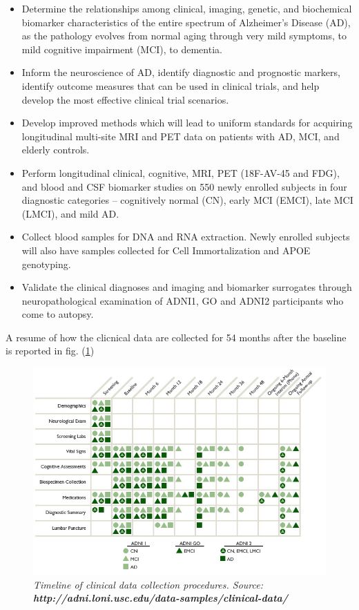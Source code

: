 \documentclass[12pt,openright,twoside,a4paper]{book}
\begin{document}
\begin{itemize}
\item Determine the relationships among clinical, imaging, genetic, and biochemical biomarker characteristics of the entire spectrum of Alzheimer’s Disease (AD), as the pathology evolves from normal aging through very mild symptoms, to mild cognitive impairment (MCI), to dementia.

\item Inform the neuroscience of AD, identify diagnostic and prognostic markers, identify outcome measures that can be used in clinical trials, and help develop the most effective clinical trial scenarios.

\item Develop improved methods which will lead to uniform standards for acquiring longitudinal multi-site MRI and PET data on patients with AD, MCI, and elderly controls.

\item Perform longitudinal clinical, cognitive, MRI, PET (18F-AV-45 and
FDG), and blood and CSF biomarker studies on 550 newly enrolled
subjects in four diagnostic categories – cognitively normal (CN),
early MCI (EMCI), late MCI (LMCI), and mild AD. 

\item Collect blood samples for DNA and RNA extraction. Newly enrolled subjects will also have samples collected for Cell Immortalization and APOE genotyping.

\item Validate the clinical diagnoses and imaging and biomarker surrogates through neuropathological examination of ADNI1, GO and ADNI2 participants who come to autopsy.

\end{itemize}

A resume of how the clicnical data are collected for 54 months after the baseline is reported in fig. (\ref{clinicADNI})

\clearpage

\begin{figure}[!h]
\centering
\includegraphics[scale=0.5]{clinical-ADNI}
\caption{\textit{Timeline of clinical data collection procedures. Source: \textbf{http://adni.loni.usc.edu/data-samples/clinical-data/}}}
\label{clinicADNI}
\end{figure}
\end{document}
